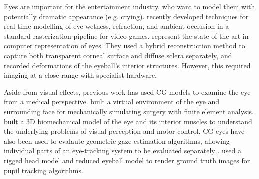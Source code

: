 Eyes are important for the entertainment industry, who want to model them with potentially dramatic appearance (e.g. crying).
\mbox{\citet{ActiBlizEyes}} recently developed techniques for real-time modelling of eye wetness, refraction, and ambient occlusion in a standard rasterization pipeline for video games.
\citet{berard2014highquality} represent the state-of-the-art in computer representation of eyes.
They used a hybrid reconstruction method to capture both transparent corneal surface and diffuse sclera separately, and recorded deformations of the eyeball's interior structures.
However, this required imaging at a close range with specialist hardware.

Aside from visual effects, previous work has used CG models to examine the eye from a medical perspective.
\citet{sagar1994virtual} built a virtual environment of the eye and surrounding face for mechanically simulating surgery with finite element analysis.
\citet{priamikov14_openeyesim} built a 3D biomechanical model of the eye and its interior muscles to understand the underlying problems of visual perception and motor control.
CG eyes have also been used to evalaute geometric gaze estimation algorithms, allowing individual parts of an eye-tracking system to be evaluated separately \cite{bohme2008software,swirski2014rendering}. \citet{swirski2014rendering} used a rigged head model and reduced eyeball model to render ground truth images for pupil tracking algorithms.




